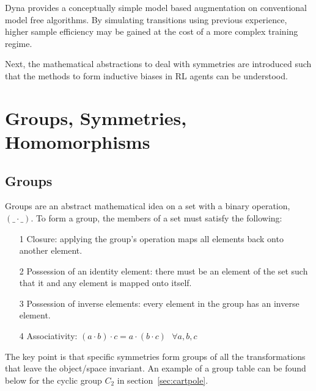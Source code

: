 Dyna provides a conceptually simple model based augmentation on conventional model free algorithms. By simulating transitions using previous experience, higher sample efficiency may be gained at the cost of a more complex training regime.

Next, the mathematical abstractions to deal with symmetries are introduced such that the methods to form inductive biases in RL agents can be understood.
\section{Groups, Symmetries, Homomorphisms}

\subsection{Groups}
Groups are an abstract mathematical idea on a set with a binary operation, $(\text{\_}\cdot \text{\_})$. To form a group, the members of a set must satisfy the following:
\begin{itemize}
	\item[1] Closure: applying the group's operation maps all elements back onto another element.
	\item[2] Possession of an identity element: there must be an element of the set such that it and any element is mapped onto itself.
	\item[3] Possession of inverse elements: every element in the group has an inverse element.
	\item [4] Associativity: $(a \cdot b) \cdot c = a \cdot (b \cdot c) \text{  }\forall a, b, c$
\end{itemize}
The key point is that specific symmetries form groups of all the transformations that leave the object/space invariant. An example of a group table can be found below for the cyclic group $C_2$ in section~\ref{sec:cartpole}.

